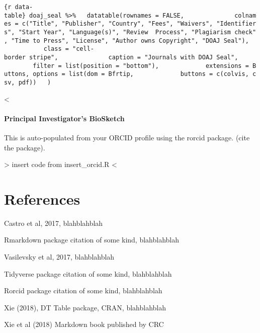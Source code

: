 \documentclass[]{article}
\let\oldparagraph\paragraph
\renewcommand{\paragraph}[1]{\oldparagraph{#1}\mbox{}}
\begin{document}
\texttt{\{r\ data-table\}\ doaj\_seal\ \%\textgreater{}\%\ \ \ datatable(rownames\ =\ FALSE,\ \ \ \ \ \ \ \ \ \ \ \ \ \ colnames\ =\ c("Title",\ "Publisher",\ "Country",\ "Fees",\ "Waivers",\ "Identifiers",\ "Start\ Year",\ "Language(s)",\ "Review\ \ Process",\ "Plagiarism\ check",\ "Time\ to\ Press",\ "License",\ "Author\ owns\ Copyright",\ "DOAJ\ Seal"),\ \ \ \ \ \ \ \ \ \ \ \ \ class\ =\ "cell-border\ stripe",\ \ \ \ \ \ \ \ \ \ \ \ \ \ caption\ =\ "Journals\ with\ DOAJ\ Seal",\ \ \ \ \ \ \ \ \ \ \ \ \ filter\ =\ list(position\ =\ "bottom"),\ \ \ \ \ \ \ \ \ \ \ \ \ extensions\ =\ \textquotesingle{}Buttons\textquotesingle{},\ options\ =\ list(dom\ =\ \textquotesingle{}Bfrtip\textquotesingle{},\ \ \ \ \ \ \ \ \ \ \ \ \ buttons\ =\ c(\textquotesingle{}colvis\textquotesingle{},\ \textquotesingle{}csv\textquotesingle{},\ \textquotesingle{}pdf\textquotesingle{}))\ \ \ )}

\textless{}\textbar{}\textbar{}

\paragraph{Principal Investigator's
BioSketch}\label{principal-investigators-biosketch}

This is auto-populated from your ORCID profile using the rorcid package.
(cite the package).

\textbar{}\textbar{}\textgreater{} insert code from insert\_orcid.R
\textless{}\textbar{}\textbar{}

\section{References}\label{references}

Castro et al, 2017, blahblahblah

Rmarkdown package citation of some kind, blahblahblah

Vasilevsky et al, 2017, blahblahblah

Tidyverse package citation of some kind, blahblahblah

Rorcid package citation of some kind, blahblahblah

Xie (2018), DT Table package, CRAN, blahblahblah

Xie et al (2018) Markdown book published by CRC
\end{document}
